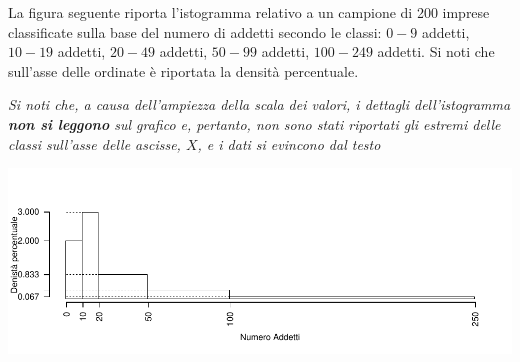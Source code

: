 \documentclass[
  11pt,
]{book}
\theoremstyle{mytheoremstyle}
\theoremstyle{mydefstyle}
\begin{document}
La figura seguente riporta l'istogramma relativo a un campione
di 200 imprese classificate sulla base del numero di addetti
secondo le classi: \(0-9\) addetti, \(10-19\) addetti, \(20-49\) addetti,
\(50-99\) addetti, \(100-249\) addetti.
Si noti che sull'asse delle ordinate è riportata la densità
percentuale.

\emph{Si noti che, a causa dell'ampiezza della scala dei valori, i dettagli dell'istogramma \textbf{non si leggono} sul grafico e, pertanto, non sono stati riportati gli estremi delle classi sull'asse delle ascisse, \(X\), e i dati si evincono dal testo}

\begin{center}\includegraphics{Esami_passati_con_soluzioni_files/figure-latex/01-descr-15-1} \end{center}
\end{document}
